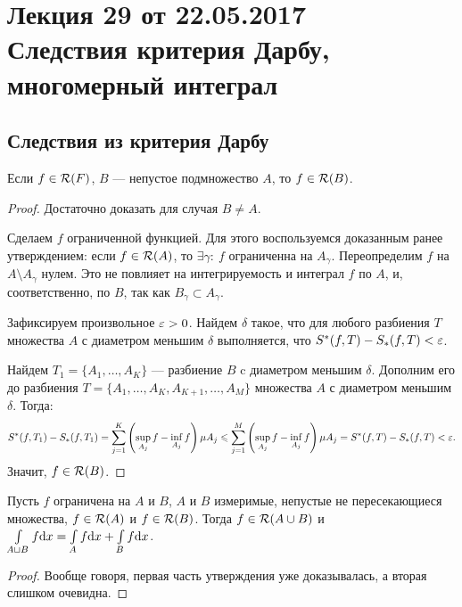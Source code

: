 \section{Лекция 29 от 22.05.2017 \\ Следствия критерия Дарбу, многомерный интеграл}

\subsection{Следствия из критерия Дарбу}

\begin{Statement}
Если $f \in \mathcal{R}(F)$, $B$ --- непустое подмножество $A$, то $f \in \mathcal{R}(B)$.
\end{Statement}
\begin{proof}
Достаточно доказать для случая $B \neq A$.

Сделаем $f$ ограниченной функцией. Для этого воспользуемся доказанным ранее утверждением: если $f \in \mathcal{R}(A)$, то $\exists \gamma:\ f$ ограниченна на $A_\gamma$. Переопределим $f$ на $A \setminus A_\gamma$ нулем. Это не повлияет на интегрируемость и интеграл $f$ по $A$, и, соответственно, по $B$, так как $B_\gamma \subset A_\gamma$.

Зафиксируем произвольное $\varepsilon > 0$. Найдем $\delta$ такое, что для любого разбиения $T$ множества $A$ с диаметром меньшим $\delta$ выполняется, что $S^*(f, T) - S_*(f, T) < \varepsilon$.

Найдем $T_1 = \{ A_1, \ldots, A_K \}$ --- разбиение $B$ c диаметром меньшим $\delta$. Дополним его до разбиения $T = \{ A_1, \ldots, A_K, A_{K+1}, \ldots, A_M \}$ множества $A$ с диаметром меньшим $\delta$. Тогда:
\begin{gather*}
S^*(f, T_1) - S_*(f, T_1) = \sum\limits_{j = 1}^K\left( \sup\limits_{A_j}f - \inf\limits_{A_j}f \right)\mu A_j \leqslant \sum\limits_{j = 1}^M\left( \sup\limits_{A_j}f - \inf\limits_{A_j}f \right)\mu A_j = S^*(f, T) - S_*(f, T) < \varepsilon.
\end{gather*}
Значит, $f \in \mathcal{R}(B)$.
\end{proof}

\begin{Statement}
Пусть $f$ ограничена на $A$ и $B$, $A$ и $B$ измеримые, непустые не пересекающиеся множества, $f \in \mathcal{R}(A)$ и $f \in \mathcal{R}(B)$. Тогда $f \in \mathcal{R}(A \cup B)$ и $\int\limits_{A \sqcup B}f \mathrm{d} x = \int\limits_A f \mathrm{d} x + \int\limits_B f \mathrm{d} x$.
\end{Statement}
\begin{proof}
Вообще говоря, первая часть утверждения уже доказывалась, а вторая слишком очевидна.
\end{proof}

